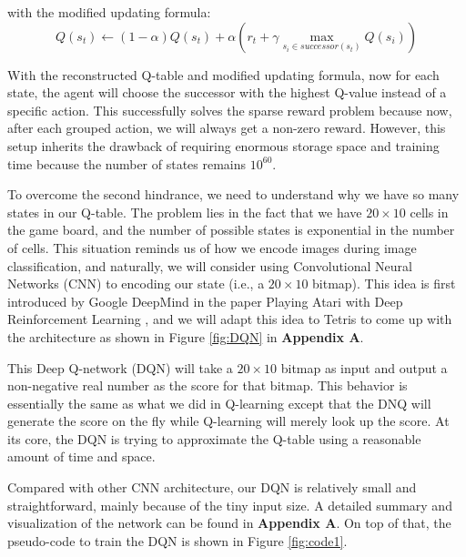 \documentclass[letterpaper]{article} %
\begin{document}
with the modified updating formula:
\[
    Q(s_{t}) \leftarrow (1-\alpha) Q(s_{t}) + \alpha   \left ( r_{t} + \gamma  \max_{s_{i} \in successor(s_{t})}Q(s_{i})\right ) 
\]

With the reconstructed Q-table and modified updating formula, now for each state, the agent will choose the successor with the highest Q-value instead of a specific action. This successfully solves the sparse reward problem because now, after each grouped action, we will always get a non-zero reward. However, this setup inherits the drawback of requiring enormous storage space and training time because the number of states remains $10^{60}$. 

To overcome the second hindrance, we need to understand why we have so many states in our Q-table. The problem lies in the fact that we have $20\times 10$ cells in the game board, and the number of possible states is exponential in the number of cells. This situation reminds us of how we encode images during image classification, and naturally, we will consider using Convolutional Neural Networks (CNN) to encoding our state (i.e., a $20\times 10$ bitmap).  This idea is first introduced by Google DeepMind in the paper Playing Atari with Deep Reinforcement Learning \cite{Mnih_2013}, and we will adapt this idea to Tetris to come up with the architecture as shown in Figure \ref{fig:DQN} in \textbf{Appendix A}.

This Deep Q-network (DQN) will take a $20\times 10$ bitmap as input and output a non-negative real number as the score for that bitmap. This behavior is essentially the same as what we did in Q-learning except that the DNQ will generate the score on the fly while Q-learning will merely look up the score. At its core, the DQN is trying to approximate the Q-table using a reasonable amount of time and space. 

Compared with other CNN architecture, our DQN is relatively small and straightforward, mainly because of the tiny input size. A detailed summary and visualization of the network can be found in \textbf{Appendix A}. On top of that, the pseudo-code to train the DQN is shown in Figure \ref{fig:code1}.
\end{document}
